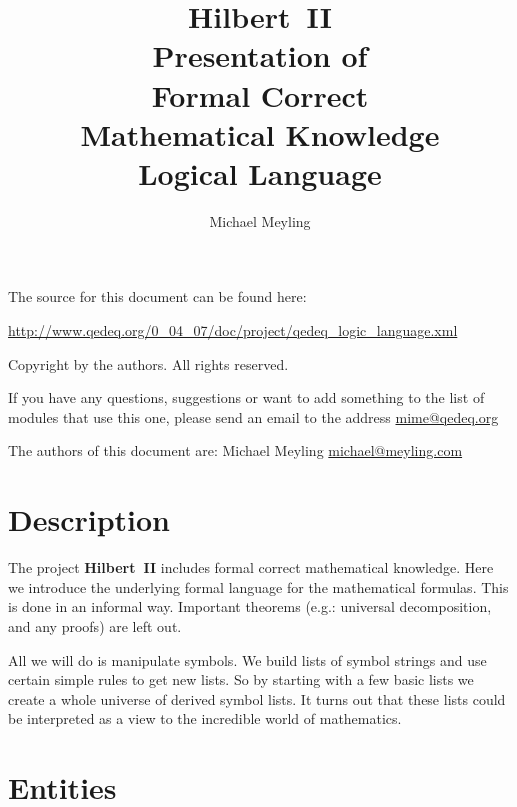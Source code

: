 \documentclass[a4paper,german,10pt,twoside]{book}
\title{\textbf{Hilbert~II} \\
\vspace*{1cm} 
Presentation of \\ 
Formal Correct \\
Mathematical Knowledge \\
\vspace*{1cm} Logical Language}
\author{
Michael Meyling
}
\theoremstyle{definition}
\theoremstyle{remark}
\begin{document}
\maketitle

\setlength{\parskip}{5pt plus 2pt minus 1pt}
\mbox{}
\vfill

\par
The source for this document can be found here:
\par
\url{http://www.qedeq.org/0_04_07/doc/project/qedeq_logic_language.xml}

\par
Copyright by the authors. All rights reserved.
\par
If you have any questions, suggestions or want to add something to the list of modules that use this one, please send an email to the address \href{mailto:mime@qedeq.org}{mime@qedeq.org}

\par
The authors of this document are:
Michael Meyling \href{mailto:michael@meyling.com}{michael@meyling.com}



\setlength{\parskip}{0pt}
\tableofcontents

\setlength{\parskip}{5pt plus 2pt minus 1pt}

\chapter*{Description} \label{chapter1} \hypertarget{chapter1}{}

The project \textbf{Hilbert~II} includes formal correct mathematical knowledge. Here we introduce the underlying formal language for the mathematical formulas. This is done in an informal way. Important theorems (e.g.: universal decomposition, and any proofs) are left out.

\par
All we will do is manipulate symbols. We build lists of symbol strings and use certain simple rules to get new lists. So by starting with a few basic lists we create a whole universe of derived symbol lists. 
It turns out that these lists could be interpreted as a view to the incredible world of mathematics.


\chapter{Entities} \label{chapter2} \hypertarget{chapter2}{}
\end{document}
